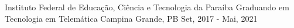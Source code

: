 
\begin{cventries}
  \cventry
  {Instituto Federal de Educação, Ciência e Tecnologia da Paraíba} %
  {Graduando em Tecnologia em Telemática} %
  {Campina Grande, PB} %
  {Set, 2017 - Mai, 2021} %
  {}
\end{cventries}
